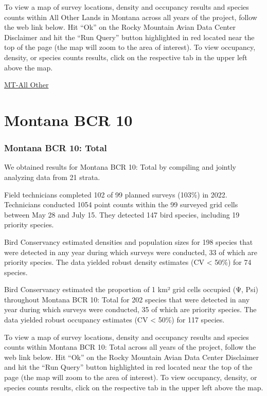 \documentclass[
  letterpaper,
  DIV=11,
  numbers=noendperiod,
  oneside]{scrreprt}
\begin{document}
To view a map of survey locations, density and occupancy results and
species counts within All Other Lands in Montana across all years of the
project, follow the web link below. Hit ``Ok'' on the Rocky Mountain
Avian Data Center Disclaimer and hit the ``Run Query'' button
highlighted in red located near the top of the page (the map will zoom
to the area of interest). To view occupancy, density, or species counts
results, click on the respective tab in the upper left above the map.

\href{http://www.rmbo.org/new_site/adc/QueryWindow.aspx\#N4IgzgrgDgpgTmALnAhoiBbEAuABCAWQBUBaAQQBsLcB5RAC3hAF8g==}{MT-All
Other}

\hypertarget{montana-bcr-10}{%
\section{Montana BCR 10}\label{montana-bcr-10}}

\hypertarget{montana-bcr-10-total}{%
\subsubsection{Montana BCR 10: Total}\label{montana-bcr-10-total}}

We obtained results for Montana BCR 10: Total by compiling and jointly
analyzing data from 21 strata.

Field technicians completed 102 of 99 planned surveys (103\%) in 2022.
Technicians conducted 1054 point counts within the 99 surveyed grid
cells between May 28 and July 15. They detected 147 bird species,
including 19 priority species.

Bird Conservancy estimated densities and population sizes for 198
species that were detected in any year during which surveys were
conducted, 33 of which are priority species. The data yielded robust
density estimates (CV \textless{} 50\%) for 74 species.

Bird Conservancy estimated the proportion of 1 km² grid cells occupied
(Ψ, Psi) throughout Montana BCR 10: Total for 202 species that were
detected in any year during which surveys were conducted, 35 of which
are priority species. The data yielded robust occupancy estimates (CV
\textless{} 50\%) for 117 species.

To view a map of survey locations, density and occupancy results and
species counts within Montana BCR 10: Total across all years of the
project, follow the web link below. Hit ``Ok'' on the Rocky Mountain
Avian Data Center Disclaimer and hit the ``Run Query'' button
highlighted in red located near the top of the page (the map will zoom
to the area of interest). To view occupancy, density, or species counts
results, click on the respective tab in the upper left above the map.
\end{document}
